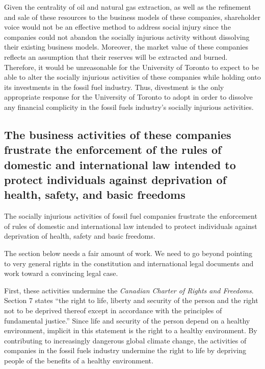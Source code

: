 Given the centrality of oil and natural gas extraction, as well as the refinement and sale of these resources to the business models of these companies, shareholder voice would not be an effective method to address social injury since the companies could not abandon the socially injurious activity without dissolving their existing business models.  
Moreover, the market value of these companies reflects an assumption that their reserves will be extracted and burned.  
Therefore, it would be unreasonable for the University of Toronto to expect to be able to alter the socially injurious activities of these companies while holding onto its investments in the fossil fuel industry.  
Thus, divestment is the only appropriate response for the University of Toronto to adopt in order to dissolve any financial complicity in the fossil fuels industry’s socially injurious activities.  



	\subsection{The business activities of these companies frustrate the enforcement of the rules of domestic and international law intended to protect individuals against deprivation of health, safety, and basic freedoms}



The socially injurious activities of fossil fuel companies frustrate the enforcement of rules of domestic and international law intended to protect individuals against deprivation of health, safety and basic freedoms.  



\begin{vcom}
	The section below needs a fair amount of work. We need to go beyond pointing to very general rights in the constitution and international legal documents and work toward a convincing legal case.
\end{vcom}



First, these activities undermine the \emph{Canadian Charter of Rights and Freedoms}.  
Section 7 states ``the right to life, liberty and security of the person and the right not to be deprived thereof except in accordance with the principles of fundamental justice.''   
Since life and security of the person depend on a healthy environment, implicit in this statement is the right to a healthy environment.  
By contributing to increasingly dangerous global climate change, the activities of companies in the fossil fuels industry undermine the right to life by depriving people of the benefits of a healthy environment.  



